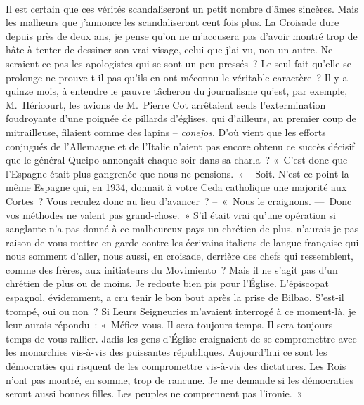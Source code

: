 \documentclass[french,twoside]{book} %
\newcommand{\astertri}{\medskip\par\centerline{\color{rubric}\large\selectfont{\syms ✻\,✻\,✻}}\medskip\par}%
\begin{document}
\noindent  \par
Il est certain que ces vérités scandaliseront un petit nombre d’âmes sincères. Mais les malheurs que j’annonce les scandaliseront cent fois plus. La Croisade dure depuis près de deux ans, je pense qu’on ne m’accusera pas d’avoir montré trop de hâte à tenter de dessiner son vrai visage, celui que j’ai vu, non un autre. Ne seraient-ce pas les apologistes qui se sont un peu pressés ? Le seul fait qu’elle se prolonge ne prouve-t-il pas qu’ils en ont méconnu le véritable caractère ? Il y a quinze mois, à entendre le pauvre tâcheron du journalisme qu’est, par exemple, M. Héricourt, les avions de M. Pierre Cot arrêtaient seuls l’extermination foudroyante d’une poignée de pillards d’églises, qui d’ailleurs, au premier coup de mitrailleuse, filaient comme des lapins – \emph{conejos}. D’où vient que les efforts conjugués de l’Allemagne et de l’Italie n’aient pas encore obtenu ce succès décisif que le général Queipo annonçait chaque soir dans sa charla ? « C’est donc que l’Espagne était plus gangrenée que nous ne pensions. » – Soit. N’est-ce point la même Espagne qui, en 1934, donnait à votre Ceda catholique une majorité aux Cortes ? Vous reculez donc au lieu d’avancer ? – « Nous le craignons. — Donc vos méthodes ne valent pas grand-chose. » S’il était vrai qu’une opération si sanglante n’a pas donné à ce malheureux pays un chrétien de plus, n’aurais-je pas raison de vous mettre en garde contre les écrivains italiens de langue française qui nous somment d’aller, nous aussi, en croisade, derrière des chefs qui ressemblent, comme des frères, aux initiateurs du Movimiento ? Mais il ne s’agit pas d’un chrétien de plus ou de moins. Je redoute bien pis pour l’Église. L’épiscopat espagnol, évidemment, a cru tenir le bon bout après la prise de Bilbao. S’est-il trompé, oui ou non ? Si Leurs Seigneuries m’avaient interrogé à ce moment-là, je leur aurais répondu : « Méfiez-vous. Il sera toujours temps. Il sera toujours temps de vous rallier. Jadis les gens d’Église craignaient de se compromettre avec les monarchies vis-à-vis des puissantes républiques. Aujourd’hui ce sont les démocraties qui risquent de les compromettre vis-à-vis des dictatures. Les Rois n’ont pas montré, en somme, trop de rancune. Je me demande si les démocraties seront aussi bonnes filles. Les peuples ne comprennent pas l’ironie. »\par
 \par

\astertri
\end{document}
